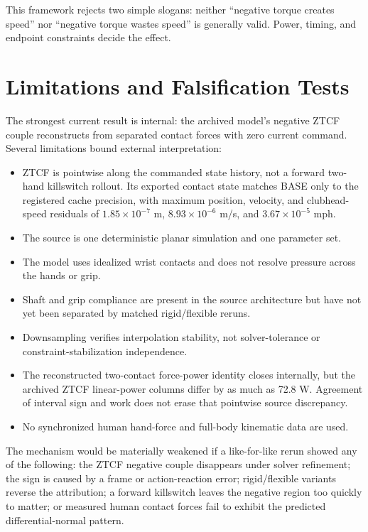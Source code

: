 \documentclass[
  letterpaper,
]{report}
\providecommand{\tightlist}{%
  \setlength{\itemsep}{0pt}\setlength{\parskip}{0pt}}
\begin{document}
This framework rejects two simple slogans: neither ``negative torque
creates speed'' nor ``negative torque wastes speed'' is generally valid.
Power, timing, and endpoint constraints decide the effect.

\section{Limitations and Falsification
Tests}\label{sec-two-hand-limitations}

The strongest current result is internal: the archived model's negative
ZTCF couple reconstructs from separated contact forces with zero current
command. Several limitations bound external interpretation:

\begin{itemize}
\tightlist
\item
  ZTCF is pointwise along the commanded state history, not a forward
  two-hand killswitch rollout. Its exported contact state matches BASE
  only to the registered cache precision, with maximum position,
  velocity, and clubhead- speed residuals of \(1.85\times10^{-7}\) m,
  \(8.93\times10^{-6}\) m/s, and \(3.67\times10^{-5}\) mph.
\item
  The source is one deterministic planar simulation and one parameter
  set.
\item
  The model uses idealized wrist contacts and does not resolve pressure
  across the hands or grip.
\item
  Shaft and grip compliance are present in the source architecture but
  have not yet been separated by matched rigid/flexible reruns.
\item
  Downsampling verifies interpolation stability, not solver-tolerance or
  constraint-stabilization independence.
\item
  The reconstructed two-contact force-power identity closes internally,
  but the archived ZTCF linear-power columns differ by as much as 72.8
  W. Agreement of interval sign and work does not erase that pointwise
  source discrepancy.
\item
  No synchronized human hand-force and full-body kinematic data are
  used.
\end{itemize}

The mechanism would be materially weakened if a like-for-like rerun
showed any of the following: the ZTCF negative couple disappears under
solver refinement; the sign is caused by a frame or action-reaction
error; rigid/flexible variants reverse the attribution; a forward
killswitch leaves the negative region too quickly to matter; or measured
human contact forces fail to exhibit the predicted differential-normal
pattern.
\end{document}
